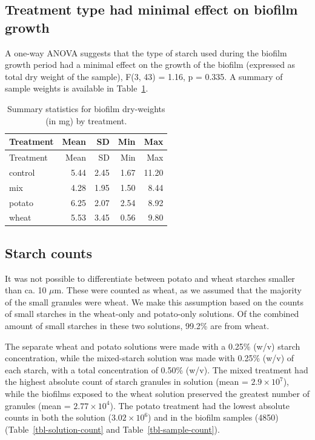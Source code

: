 \documentclass[
  b5paper,
]{book}
\begin{document}
\hypertarget{treatment-type-had-minimal-effect-on-biofilm-growth}{%
\subsection{Treatment type had minimal effect on biofilm
growth}\label{treatment-type-had-minimal-effect-on-biofilm-growth}}

A one-way ANOVA suggests that the type of starch used during the biofilm
growth period had a minimal effect on the growth of the biofilm
(expressed as total dry weight of the sample), F(3, 43) = 1.16, p =
0.335. A summary of sample weights is available in
Table~\ref{tbl-anova}.

\hypertarget{tbl-anova}{}
\begin{longtable}[]{@{}lrrrr@{}}
\caption{\label{tbl-anova}Summary statistics for biofilm dry-weights (in
mg) by treatment.}\tabularnewline
\toprule\noalign{}
Treatment & Mean & SD & Min & Max \\
\midrule\noalign{}
\endfirsthead
\toprule\noalign{}
Treatment & Mean & SD & Min & Max \\
\midrule\noalign{}
\endhead
\bottomrule\noalign{}
\endlastfoot
control & 5.44 & 2.45 & 1.67 & 11.20 \\
mix & 4.28 & 1.95 & 1.50 & 8.44 \\
potato & 6.25 & 2.07 & 2.54 & 8.92 \\
wheat & 5.53 & 3.45 & 0.56 & 9.80 \\
\end{longtable}

\hypertarget{starch-counts}{%
\subsection{Starch counts}\label{starch-counts}}

It was not possible to differentiate between potato and wheat starches
smaller than ca. 10 \(\mu\)m. These were counted as wheat, as we assumed
that the majority of the small granules were wheat. We make this
assumption based on the counts of small starches in the wheat-only and
potato-only solutions. Of the combined amount of small starches in these
two solutions, 99.2\% are from wheat.

The separate wheat and potato solutions were made with a 0.25\% (w/v)
starch concentration, while the mixed-starch solution was made with
0.25\% (w/v) of each starch, with a total concentration of 0.50\% (w/v).
The mixed treatment had the highest absolute count of starch granules in
solution (mean = \ensuremath{2.9\times 10^{7}}), while the biofilms
exposed to the wheat solution preserved the greatest number of granules
(mean = \ensuremath{2.77\times 10^{4}}). The potato treatment had the
lowest absolute counts in both the solution
(\ensuremath{3.02\times 10^{6}}) and in the biofilm samples (4850)
(Table~\ref{tbl-solution-count} and Table~\ref{tbl-sample-count}).
\end{document}
